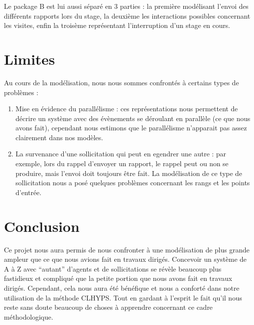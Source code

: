 \documentclass[12pt,a4paper]{article}
\begin{document}
Le package B est lui aussi séparé en 3 parties : la première modélisant l'envoi
des différents rapports lors du stage, la deuxième les interactions possibles
concernant les visites, enfin la troisème représentant l'interruption d'un stage
en cours.

{
    \newpage {} 
    
    \restoregeometry {} \newpage
}

{
    \newpage {} 
    
    \restoregeometry {} \newpage
}

{
    \newpage {} 
    
    \restoregeometry {} \newpage
}

\section{Limites}

Au cours de la modélisation, nous nous sommes confrontés à certains types de
problèmes :
\begin{enumerate}
    \item Mise en évidence du parallélisme : ces représentations nous permettent
        de décrire un système avec des évènements se déroulant en parallèle (ce
        que nous avons fait), cependant nous estimons que le parallélisme
        n'apparait pas assez clairement dans nos modèles.
    \item La survenance d'une sollicitation qui peut en egendrer une autre : par
        exemple, lors du rappel d'envoyer un rapport, le rappel peut ou non se
        produire, mais l'envoi doit toujours être fait. La modélisation de ce
        type de sollicitation nous a posé quelques problèmes concernant les
        rangs et les points d'entrée.
\end{enumerate}

\section{Conclusion}

Ce projet nous aura permis de nous confronter à une modélisation de plus grande
ampleur que ce que nous avions fait en travaux dirigés. Concevoir un système de
A à Z avec \enquote{autant} d'agents et de sollicitations se révèle beaucoup
plus fastidieux et compliqué que la petite portion que nous avons fait en
travaux dirigés. Cependant, cela nous aura été bénéfique et nous a conforté dans
notre utilisation de la méthode CLHYPS. Tout en gardant à l'esprit le fait qu'il
nous reste sans doute beaucoup de choses à apprendre concernant ce cadre
méthodologique.
\end{document}
